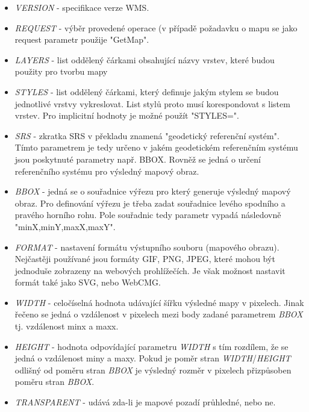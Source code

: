 \begin{itemize}
	\item\textit{VERSION} - specifikace verze WMS.
	
	\item\textit{REQUEST} - výběr provedené operace (v případě požadavku o mapu se jako request parametr použije "GetMap".
	
	\item\textit{LAYERS} - list oddělený čárkami obsahující názvy vrstev, které budou použity pro tvorbu mapy
	
	\item\textit{STYLES} - list oddělený čárkami, který definuje jakým stylem se budou jednotlivé vrstvy vykreslovat. List stylů proto musí korespondovat s listem vrstev. Pro implicitní hodnoty je možné použít "STYLES=".
	
	\item\textit{SRS} - zkratka SRS v překladu znamená "geodetický referenční systém". Tímto parametrem je tedy určeno v jakém geodetickém referenčním systému jsou poskytnuté parametry např. BBOX. Rovněž se jedná o určení referenčního systému pro výsledný mapový obraz. 
	
	\item\textit{BBOX} - jedná se o souřadnice výřezu pro který generuje výsledný mapový obraz. Pro definování výřezu je třeba zadat souřadnice levého spodního a pravého horního rohu. Pole souřadnic tedy parametr vypadá následovně "minX,minY,maxX,maxY".  
	
	\item\textit{FORMAT} - nastavení formátu výstupního souboru (mapového obrazu). Nejčastěji používané jsou formáty GIF, PNG, JPEG, které mohou být jednoduše zobrazeny na webových prohlížečích. Je však možnost nastavit formát také jako SVG, nebo WebCMG. 
	
	\item\textit{WIDTH} - celočíselná hodnota udávající šířku výsledné mapy v pixelech. Jinak řečeno se jedná o vzdálenost v pixelech mezi body zadané parametrem \textit{BBOX} tj. vzdálenost minx a maxx.
	
	\item\textit{HEIGHT} - hodnota odpovídající parametru \textit{WIDTH} s tím rozdílem, že se jedná o vzdálenost miny a maxy. Pokud je poměr stran \textit{WIDTH}/\textit{HEIGHT} odlišný od poměru stran \textit{BBOX} je výsledný rozměr v pixelech přizpůsoben poměru stran \textit{BBOX}.
	
	\item\textit{TRANSPARENT} - udává zda-li je mapové pozadí průhledné, nebo ne.  
\end{itemize}

